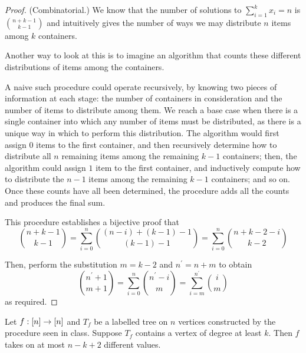 \documentclass[11pt]{article}
\begin{document}
\begin{proof}{(Combinatorial.)}
    We know that the number of solutions to $\sum_{i=1}^k x_i = n$ is
    $\binom{n+k-1}{k-1}$ and intuitively gives the number of ways we may
    distribute $n$ items among $k$ containers.

    Another way to look at this is to imagine an algorithm that counts these
    different distributions of items among the containers.

    A naive such procedure could operate recursively, by knowing two pieces of
    information at each stage: the number of containers in consideration and
    the number of items to distribute among them.
    We reach a base case when there is a single container into which any number
    of items must be distributed, as there is a unique way in which to perform
    this distribution.
    The algorithm would first assign $0$ items to the first container,
    and then recursively determine how to distribute all $n$ remaining items
    among the remaining $k-1$ containers;
    then, the algorithm could assign $1$ item to the first container, and
    inductively compute how to distribute the $n-1$ items among the remaining
    $k-1$ containers; and so on.
    Once these counts have all been determined, the procedure adds all the
    counts and produces the final sum.

    This procedure establishes a bijective proof that
    \begin{equation*}
        \binom{n + k - 1}{k - 1}
        = \sum_{i=0}^n \binom{(n - i) + (k - 1) - 1}{(k - 1) - 1}
        = \sum_{i=0}^n \binom{n + k - 2 - i}{k - 2}
    \end{equation*}

    Then, perform the substitution $m = k - 2$ and $n^\prime = n + m$ to
    obtain
    \begin{equation*}
        \binom{n^\prime + 1}{m + 1}
        =
        \sum_{i=0}^n \binom{n^\prime - i}{m}
        = 
        \sum_{i=m}^{n^\prime} \binom{i}{m}
    \end{equation*}
    as required.
\end{proof}


\begin{prop}
    Let $f : \left[n\right] \to \left[n\right]$ and $T_f$ be a labelled tree on $n$ vertices
    constructed by the procedure seen in class.
    Suppose $T_f$ contains a vertex of degree at least $k$.
    Then $f$ takes on at most $n - k + 2$ different values.
\end{prop}
\end{document}
